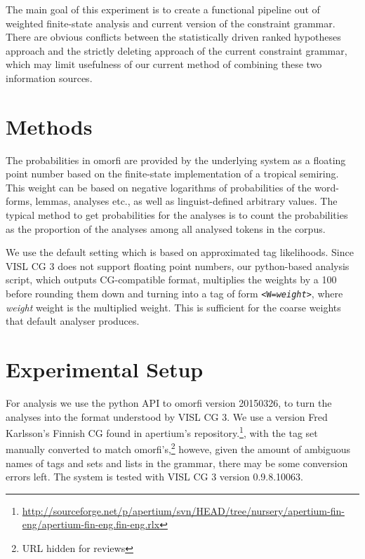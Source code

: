 \documentclass[11pt]{article}
\begin{document}
The main goal of this experiment is to create a functional
pipeline out of weighted finite-state analysis and current version of the
constraint grammar. There are obvious conflicts between the statistically
driven ranked hypotheses approach and the strictly deleting approach of the
current constraint grammar, which may limit usefulness of our current method
of combining these two information sources. 

\section{Methods}

The probabilities in omorfi are provided by the underlying system as a floating
point number based on the finite-state implementation of a tropical semiring.
This weight can be based on negative logarithms of probabilities of the
word-forms, lemmas, analyses etc., as well as linguist-defined arbitrary
values. The typical method to get probabilities for the analyses is to
count the probabilities as the proportion of the analyses among all analysed
tokens in the corpus. 

We use the default
setting which is based on approximated tag likelihoods. Since VISL CG 3 does
not support floating point numbers, our python-based analysis script, which
outputs CG-compatible format, multiplies the weights by a 100 before rounding
them down and turning into a tag of form \texttt{<W=\emph{weight}>}, where
\emph{weight} weight is the multiplied weight. This is sufficient for the
coarse weights that default analyser produces.

\section{Experimental Setup}

For analysis we use the python API to omorfi version 20150326, to turn the
analyses into the format understood by VISL CG 3. We use a version Fred
Karlsson's Finnish CG found in apertium's
repository.\footnote{\url{http://sourceforge.net/p/apertium/svn/HEAD/tree/nursery/apertium-fin-eng/apertium-fin-eng.fin-eng.rlx}},
with the tag set manually converted to match omorfi's,\footnote{URL hidden for
reviews} howeve, given the amount of ambiguous names of tags and sets and lists
in the grammar, there may be some conversion errors left.  The system is tested
with VISL CG 3 version 0.9.8.10063.
\end{document}
